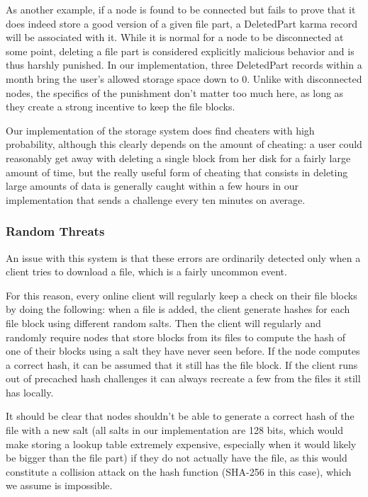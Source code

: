 \documentclass[11pt]{IEEEtran}
\begin{document}
As another example, if a node is found to be connected but fails to prove that it does indeed store a good version of a given file part, a DeletedPart karma record will be associated with it. While it is normal for a node to be disconnected at some point, deleting a file part is considered explicitly malicious behavior and is thus harshly punished. In our implementation, three DeletedPart records within a month bring the user's allowed storage space down to 0. Unlike with disconnected nodes, the specifics of the punishment don't matter too much here, as long as they create a strong incentive to keep the file blocks.

Our implementation of the storage system does find cheaters with high probability, although this clearly depends on the amount of cheating: a user could reasonably get away with deleting a single block from her disk for a fairly large amount of time, but the really useful form of cheating that consists in deleting large amounts of data is generally caught within a few hours in our implementation that sends a challenge every ten minutes on average.

\subsubsection{Random Threats}

An issue with this system is that these errors are ordinarily detected only when a client tries to download a file, which is a fairly uncommon event.

For this reason, every online client will regularly keep a check on their file blocks by doing the following: when a file is added, the client generate hashes for each file block using different random salts. Then the client will regularly and randomly require nodes that store blocks from its files to compute the hash of one of their blocks using a salt they have never seen before. If the node computes a correct hash, it can be assumed that it still has the file block. If the client runs out of precached hash challenges it can always recreate a few from the files it still has locally.

It should be clear that nodes shouldn't be able to generate a correct hash of the file with a new salt (all salts in our implementation are 128 bits, which would make storing a lookup table extremely expensive, especially when it would likely be bigger than the file part) if they do not actually have the file, as this would constitute a collision attack on the hash function (SHA-256 in this case), which we assume is impossible.
\end{document}
